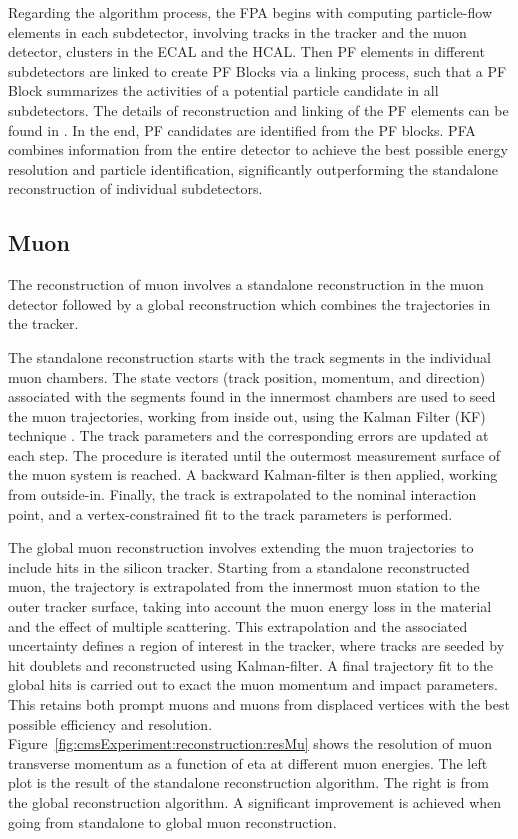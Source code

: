 Regarding the algorithm process, the FPA begins with computing particle-flow elements in each subdetector, involving tracks in the tracker and the muon detector, clusters in the ECAL and the HCAL. Then PF elements in different subdetectors are linked to create PF Blocks via a linking process, such that a PF Block summarizes the activities of a potential particle candidate in all subdetectors. The details of reconstruction and linking of the PF elements can be found in \cite{cms:particleflow:Sirunyan:2017ulk}. In the end, PF candidates are identified from the PF blocks. PFA combines information from the entire detector to achieve the best possible energy resolution and particle identification, significantly outperforming the standalone reconstruction of individual subdetectors.




\subsection{Muon}

The reconstruction of muon involves a standalone reconstruction in the muon detector followed by a global reconstruction which combines the trajectories in the tracker. 

The standalone reconstruction starts with the track segments in the individual muon chambers. The state vectors (track position, momentum, and direction) associated with the segments found in the innermost chambers are used to seed the muon trajectories, working from inside out, using the Kalman Filter (KF) technique \cite{tech:kf:Fruhwirth:1987fm}. The track parameters and the corresponding errors are updated at each step. The procedure is iterated until the outermost measurement surface of the muon system is reached. A backward Kalman-filter is then applied, working from outside-in. Finally, the track is extrapolated to the nominal interaction point, and a vertex-constrained fit to the track parameters is performed.

The global muon reconstruction involves extending the muon trajectories to include hits in the silicon tracker. Starting from a standalone reconstructed muon, the trajectory is extrapolated from the innermost muon station to the outer tracker surface, taking into account the muon energy loss in the material and the effect of multiple scattering. This extrapolation and the associated uncertainty defines a region of interest in the tracker, where tracks are seeded by hit doublets and reconstructed using Kalman-filter. A final trajectory fit to the global hits is carried out to exact the muon momentum and impact parameters. This retains both prompt muons and muons from displaced vertices with the best possible efficiency and resolution. Figure~\ref{fig:cmsExperiment:reconstruction:resMu} shows the resolution of muon transverse momentum as a function of eta at different muon energies. The left plot is the result of the standalone reconstruction algorithm. The right is from the global reconstruction algorithm. A significant improvement is achieved when going from standalone to global muon reconstruction.

